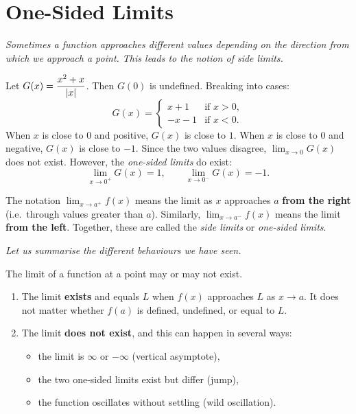 \section{One-Sided Limits}
\label{sec:2.3}

\textit{Sometimes a function approaches different values depending on the direction from which we approach a point.  This leads to the notion of side limits.}

\begin{example}
\label{ex:2-5}
Let $G(x) = \dfrac{x^{2} + x}{\left\lvert x \right\rvert}$.  Then $G(0)$ is undefined.  Breaking into cases:
\[
  G(x) =
  \begin{cases}
    x + 1 & \text{if } x > 0, \\
    -x - 1 & \text{if } x < 0.
  \end{cases}
\]
When $x$ is close to $0$ and positive, $G(x)$ is close to $1$.  When $x$ is close to $0$ and negative, $G(x)$ is close to $-1$.  Since the two values disagree, $\lim_{x \to 0} G(x)$ does not exist.  However, the \emph{one-sided limits} do exist:
\[
  \lim_{x \to 0^{+}} G(x) = 1, \qquad
  \lim_{x \to 0^{-}} G(x) = -1.
\]
\end{example}

\begin{remark}
The notation $\lim_{x \to a^{+}} f(x)$ means the limit as $x$ approaches $a$ \textbf{from the right} (i.e.\ through values greater than $a$).  Similarly, $\lim_{x \to a^{-}} f(x)$ means the limit \textbf{from the left}.  Together, these are called the \emph{side limits} or \emph{one-sided limits}.
\end{remark}

\textit{Let us summarise the different behaviours we have seen.}

\begin{remark}
The limit of a function at a point may or may not exist.
\begin{enumerate}[label=(\roman*)]
  \item The limit \textbf{exists} and equals $L$ when $f(x)$ approaches $L$ as $x \to a$.  It does not matter whether $f(a)$ is defined, undefined, or equal to $L$.
  \item The limit \textbf{does not exist}, and this can happen in several ways:
  \begin{itemize}
    \item the limit is $\infty$ or $-\infty$ (vertical asymptote),
    \item the two one-sided limits exist but differ (jump),
    \item the function oscillates without settling (wild oscillation).
  \end{itemize}
\end{enumerate}
\end{remark}

